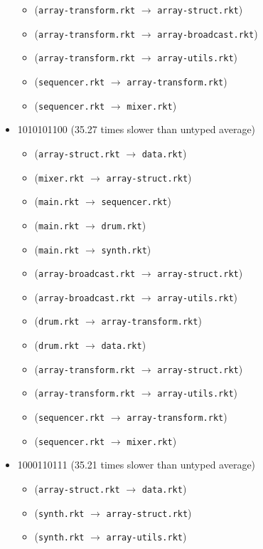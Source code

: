 \documentclass{article}
\newcommand{\mono}[1]{\texttt{#1}}
\begin{document}
\begin{itemize}
\begin{itemize}
  \item (\mono{array-transform.rkt} $\rightarrow$ \mono{array-struct.rkt})
  \item (\mono{array-transform.rkt} $\rightarrow$ \mono{array-broadcast.rkt})
  \item (\mono{array-transform.rkt} $\rightarrow$ \mono{array-utils.rkt})
  \item (\mono{sequencer.rkt} $\rightarrow$ \mono{array-transform.rkt})
  \item (\mono{sequencer.rkt} $\rightarrow$ \mono{mixer.rkt})
  \end{itemize}
\item 1010101100 (35.27 times slower than untyped average)
  \begin{itemize}
  \item (\mono{array-struct.rkt} $\rightarrow$ \mono{data.rkt})
  \item (\mono{mixer.rkt} $\rightarrow$ \mono{array-struct.rkt})
  \item (\mono{main.rkt} $\rightarrow$ \mono{sequencer.rkt})
  \item (\mono{main.rkt} $\rightarrow$ \mono{drum.rkt})
  \item (\mono{main.rkt} $\rightarrow$ \mono{synth.rkt})
  \item (\mono{array-broadcast.rkt} $\rightarrow$ \mono{array-struct.rkt})
  \item (\mono{array-broadcast.rkt} $\rightarrow$ \mono{array-utils.rkt})
  \item (\mono{drum.rkt} $\rightarrow$ \mono{array-transform.rkt})
  \item (\mono{drum.rkt} $\rightarrow$ \mono{data.rkt})
  \item (\mono{array-transform.rkt} $\rightarrow$ \mono{array-struct.rkt})
  \item (\mono{array-transform.rkt} $\rightarrow$ \mono{array-utils.rkt})
  \item (\mono{sequencer.rkt} $\rightarrow$ \mono{array-transform.rkt})
  \item (\mono{sequencer.rkt} $\rightarrow$ \mono{mixer.rkt})
  \end{itemize}
\item 1000110111 (35.21 times slower than untyped average)
  \begin{itemize}
  \item (\mono{array-struct.rkt} $\rightarrow$ \mono{data.rkt})
  \item (\mono{synth.rkt} $\rightarrow$ \mono{array-struct.rkt})
  \item (\mono{synth.rkt} $\rightarrow$ \mono{array-utils.rkt})

\end{itemize}
\end{itemize}
\end{document}
